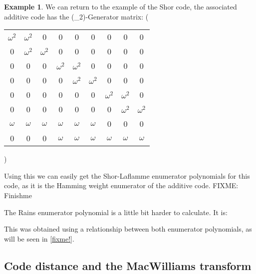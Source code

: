 \documentclass{article}
\def\F{\mathbb{F}}
\theoremstyle{definition}
\newtheorem{ex}[Satz]{Example}
\begin{document}
\begin{ex}
We can return to the example of the Shor code, the associated additive code has the (\F_2)-Generator matrix:
\left( \begin{tabular}{ccccccccc}
$\omega^ 2$ & $\omega^ 2$ & 0 & 0 & 0 & 0 & 0 & 0 & 0 \\ 
0 & $\omega^ 2$ & $\omega^ 2$ & 0 & 0 & 0 & 0 & 0 & 0 \\
0 & 0 & 0 & $\omega^ 2$ & $\omega^ 2$ & 0 & 0 & 0 & 0 \\
0 & 0 & 0 & 0 & $\omega^ 2$ & $\omega^ 2$&  0 & 0 & 0 \\
0 & 0 & 0 & 0 & 0 & 0 & $\omega^ 2$ & $\omega^ 2$ & 0 \\
0 & 0 & 0 & 0 & 0 & 0 & 0 & $\omega^ 2$ & $\omega^ 2$ \\
$\omega$ & $\omega$ & $\omega$ & $\omega$ & $\omega$ & $\omega$ & 0 & 0 & 0 \\
0 & 0 & 0 & $\omega$ & $\omega$ & $\omega$ & $\omega$ & $\omega$ & $\omega$ \\
\end{tabular} \right)

Using this we can easily get the Shor-Laflamme enumerator polynomials for this code, as it is the Hamming weight enumerator 
of the additive code. FIXME: Finishme

The Rains enumerator polynomial is a little bit harder to calculate. It is:

This was obtained using a relationship between both enumerator polynomials, as will be seen in \ref{fixme!}.
\end{ex}

\subsection{Code distance and the MacWilliams transform}
\end{document}
